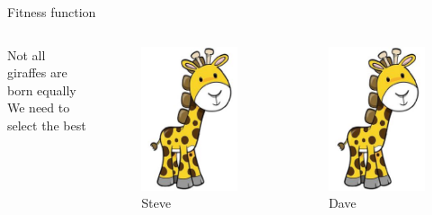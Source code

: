 \documentclass[24pt]{beamer}
\begin{document}
    \begin{frame}{Fitness function}
        \begin{columns}
                Not all giraffes are born equally\\
                We need to select the best
                \begin{figure}
                \includegraphics[scale=0.2]{giraffe}
                \caption{Steve}
                \end{figure}
                \begin{figure}
                \includegraphics[scale=0.4]{giraffe}
                \caption{Dave}
                \end{figure}
        \end{columns}
    \end{frame}
\end{document}

